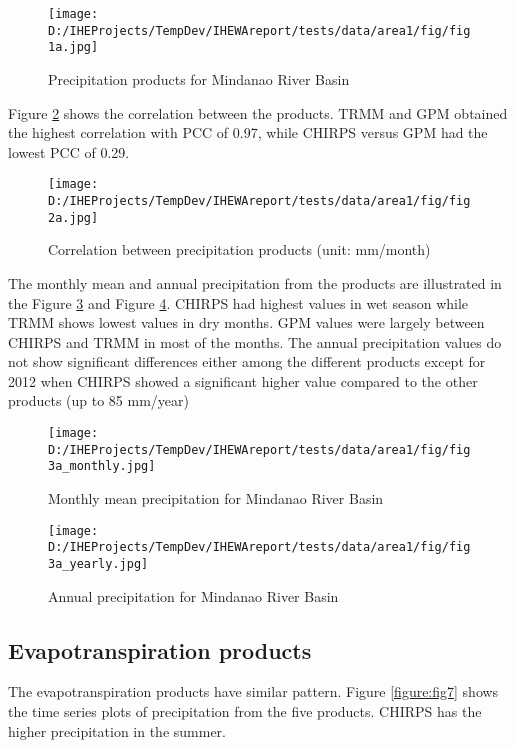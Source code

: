\documentclass{article}%
\begin{document}
\begin{figure}[H]%
\centering%
\texttt{[image: D:/IHEProjects/TempDev/IHEWAreport/tests/data/area1/fig/fig1a.jpg]}%
\caption{Precipitation products for Mindanao River Basin}%
\label{figure:fig3}%
\end{figure}

%
Figure \ref{figure:fig4} shows the correlation between the products. TRMM and GPM obtained the highest correlation with PCC of 0.97, while CHIRPS versus GPM had the lowest PCC of 0.29.%
\linebreak%


\begin{figure}[H]%
\centering%
\texttt{[image: D:/IHEProjects/TempDev/IHEWAreport/tests/data/area1/fig/fig2a.jpg]}%
\caption{Correlation between precipitation products (unit: mm/month)}%
\label{figure:fig4}%
\end{figure}

%
The monthly mean and annual precipitation from the products are illustrated in the Figure \ref{figure:fig5} and Figure \ref{figure:fig6}. CHIRPS had highest values in wet season while TRMM shows lowest values in dry months. GPM values were largely between CHIRPS and TRMM in most of the months. The annual precipitation values do not show significant differences either among the different products except for 2012 when CHIRPS showed a significant higher value compared to the other products (up to 85 mm/year)%
\linebreak%


\begin{figure}[H]%
\centering%
\texttt{[image: D:/IHEProjects/TempDev/IHEWAreport/tests/data/area1/fig/fig3a\_monthly.jpg]}%
\caption{Monthly mean precipitation for Mindanao River Basin}%
\label{figure:fig5}%
\end{figure}

%


\begin{figure}[H]%
\centering%
\texttt{[image: D:/IHEProjects/TempDev/IHEWAreport/tests/data/area1/fig/fig3a\_yearly.jpg]}%
\caption{Annual precipitation for Mindanao River Basin}%
\label{figure:fig6}%
\end{figure}

%
\subsection{Evapotranspiration products}%
\label{subsec:Evapotranspirationproducts}%
The evapotranspiration products have similar pattern. Figure \ref{figure:fig7} shows the time series plots of precipitation from the five products. CHIRPS has the higher precipitation in the summer.%
\linebreak%
\end{document}
